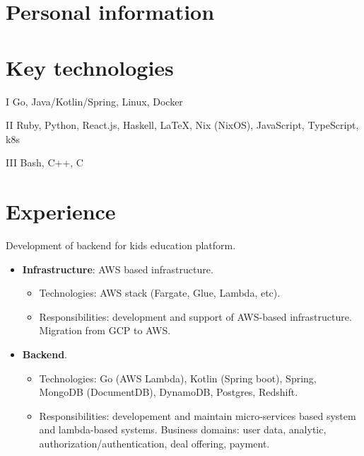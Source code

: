\documentclass{cv}
\begin{document}
\iftrue

	\section{Personal information}




\fi


\section{Key technologies}

\begin{cvblock}{I}
	Go, Java/Kotlin/Spring, Linux, Docker
\end{cvblock}

\begin{cvblock}{II}
	Ruby, Python, React.js, Haskell, \LaTeX, Nix (NixOS), JavaScript, TypeScript, k8s
\end{cvblock}

\begin{cvblock}{III}
	Bash, C++, C
\end{cvblock}


\section{Experience}

\begin{cvblock}{%
		}

	Development of backend for kids education platform.

	\begin{itemize}
		\item \textbf{Infrastructure}: AWS based infrastructure.
		      \begin{itemize}
			      \item Technologies: AWS stack (Fargate, Glue, Lambda, etc).
			      \item Responsibilities: development and support of AWS-based infrastructure. Migration from GCP to AWS.
		      \end{itemize}
		\item \textbf{Backend}.
		      \begin{itemize}
			      \item Technologies: Go (AWS Lambda), Kotlin (Spring boot), Spring, MongoDB (DocumentDB), DynamoDB, Postgres, Redshift.
			      \item Responsibilities: developement and maintain micro-services based system and lambda-based systems. Business domains:
			            user data, analytic, authorization/authentication, deal offering, payment.
		      \end{itemize}
	\end{itemize}
\end{cvblock}
\end{document}

